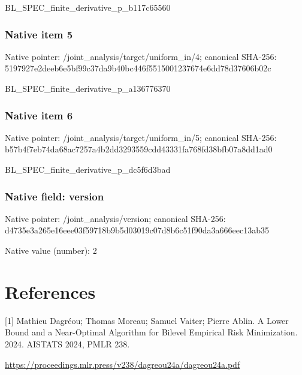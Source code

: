 \documentclass[10pt,a4paper]{article}
\begin{document}
\begingroup\raggedright\sloppy BL\_\allowbreak{}SPEC\_\allowbreak{}finite\_\allowbreak{}derivative\_\allowbreak{}p\_\allowbreak{}b117c65560\par\endgroup

\subsubsection{Native item 5}
Native pointer: /joint\_\allowbreak{}analysis/target/uniform\_\allowbreak{}in/4; canonical SHA-256: 5197927e2deeb6e5bf99c37da9b40bc446f5515001237674e6dd78d37606b02c

\begingroup\raggedright\sloppy BL\_\allowbreak{}SPEC\_\allowbreak{}finite\_\allowbreak{}derivative\_\allowbreak{}p\_\allowbreak{}a136776370\par\endgroup

\subsubsection{Native item 6}
Native pointer: /joint\_\allowbreak{}analysis/target/uniform\_\allowbreak{}in/5; canonical SHA-256: b57b4f7eb74da68ac7257a4b2dd3293559cdd43331fa768fd38bfb07a8dd1ad0

\begingroup\raggedright\sloppy BL\_\allowbreak{}SPEC\_\allowbreak{}finite\_\allowbreak{}derivative\_\allowbreak{}p\_\allowbreak{}dc5f6d3bad\par\endgroup

\subsubsection{Native field: version}
Native pointer: /joint\_\allowbreak{}analysis/version; canonical SHA-256: d4735e3a265e16eee03f59718b9b5d03019c07d8b6c51f90da3a666eec13ab35

Native value (number): 2

\section{References}
[1] Mathieu Dagréou; Thomas Moreau; Samuel Vaiter; Pierre Ablin. A Lower Bound and a Near-Optimal Algorithm for Bilevel Empirical Risk Minimization. 2024. AISTATS 2024, PMLR 238.

\url{https://proceedings.mlr.press/v238/dagreou24a/dagreou24a.pdf}
\end{document}
